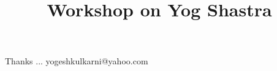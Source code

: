 \documentclass[xcolor=dvipsnames,compress,t,pdf,9pt]{beamer}
\title[\insertframenumber /\inserttotalframenumber]{Workshop on Yog Shastra}
\begin{document}
	\begin{frame}
	\titlepage
%
	\end{frame}
	
%	
	
	
	\begin{frame}[c]{}
	Thanks ...
	\vspace{5mm}
	yogeshkulkarni@yahoo.com
	\end{frame}
\end{document}
